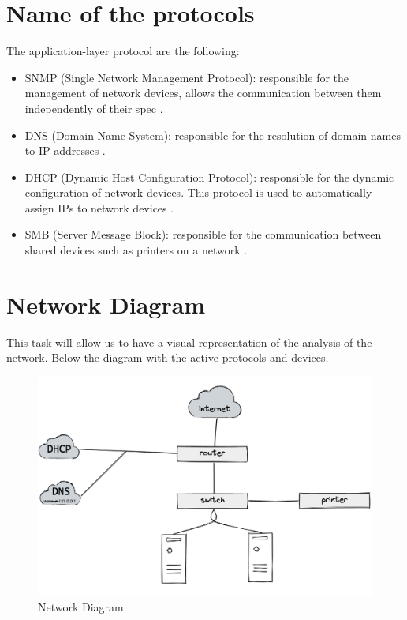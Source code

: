 \section{Name of the protocols}
\label{s:Name-of-the-protocols}
The application-layer protocol are the following:

\begin{itemize}
  \item SNMP (Single Network Management Protocol): responsible for the management of
    network devices, allows the communication between them independently of their spec \citep{
    scarpatiWhatSimpleNetwork2020}.
  \item DNS (Domain Name System): responsible for the resolution of domain names to
    IP addresses \citep{insamApplicationLayerProtocol2020}.
  \item DHCP (Dynamic Host Configuration Protocol): responsible for the dynamic
    configuration of network devices. This protocol is used to automatically assign IPs
    to network devices \citep{ibmIBMDocs2021}.
  \item SMB (Server Message Block): responsible for the communication between
    shared devices such as printers on a network \citep{
    sheldonWhatServerMessage2020}.
\end{itemize}

\section{Network Diagram}
\label{s:Network-Diagram}
This task will allow us to have a visual representation of the analysis of the network.
Below the diagram with the active protocols and devices.

\begin{figure}[ht]
  \centering
  \includegraphics[width=1\textwidth]{figures/network-diagram}
  \caption{Network Diagram}
  \label{f:network-diagram}
\end{figure}

